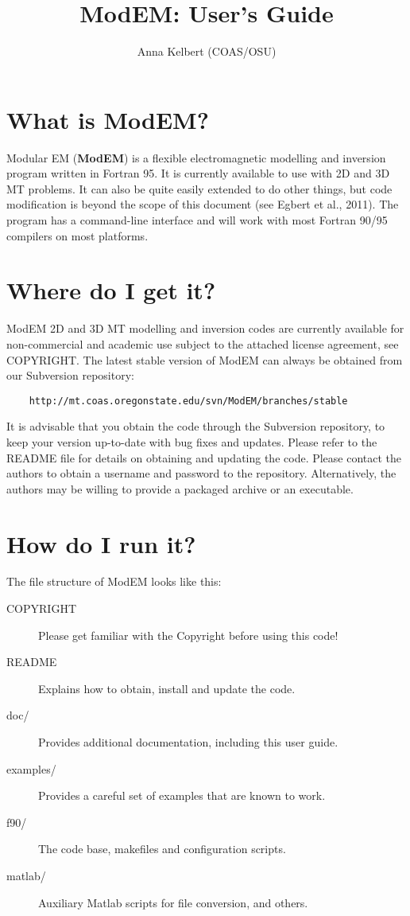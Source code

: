 \documentclass[12pt]{article}
\begin{document}
\title{ModEM: User's Guide}
\author{Anna Kelbert (COAS/OSU)}
\maketitle

\section{What is ModEM?}

Modular EM (\textbf{ModEM}) is a flexible electromagnetic modelling and inversion program written in Fortran 95. It is currently available to use with 2D and 3D MT problems. It can also be quite easily extended to do other things, but code modification is beyond the scope of this document (see Egbert et al., 2011). The program has a command-line interface and will work with most Fortran 90/95 compilers on most platforms.

\section{Where do I get it?}

ModEM 2D and 3D MT modelling and inversion codes are currently available for non-commercial and academic use subject to the attached license agreement, see COPYRIGHT. The latest stable version of ModEM can always be obtained from our Subversion repository:
\begin{verbatim}
    http://mt.coas.oregonstate.edu/svn/ModEM/branches/stable
\end{verbatim}

It is advisable that you obtain the code through the Subversion repository, to keep your version up-to-date with bug fixes and updates. Please refer to the README file for details on obtaining and updating the code. Please contact the authors to obtain a username and password to the repository. Alternatively, the authors may be willing to provide a packaged archive or an executable.

\section{How do I run it?}

The file structure of ModEM looks like this:

\begin{description}
  \item[COPYRIGHT] Please get familiar with the Copyright before using this code!
  \item[README] Explains how to obtain, install and update the code.
  \item[doc/] Provides additional documentation, including this user guide.
  \item[examples/] Provides a careful set of examples that are known to work.
  \item[f90/] The code base, makefiles and configuration scripts.
  \item[matlab/] Auxiliary Matlab scripts for file conversion, and others.
\end{description}
\end{document}
